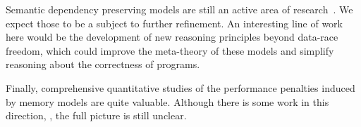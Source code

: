 
Semantic dependency preserving models are still an active 
area of research~\cite{Kang-al:POPL17, Lee-al:PLDI20, Cho-al:PLDI21,
Chakraborty-Vafeiadis:POPL19, Paviotti-al:ESOP20, 
Jagadeesan-al:OOPSLA2020}. 
We expect those to be a subject to 
further refinement. 
An interesting line of work here would be 
the development of new reasoning principles
beyond data-race freedom, which could 
improve the meta-theory of these models and 
simplify reasoning about the correctness of programs.   

Finally, comprehensive quantitative studies 
of the performance penalties induced by memory models are quite valuable.
Although there is some work in this direction,%
\cite{Singh-al:ISCA12, Liu-al:OOPSLA17, Liu-al:PLDI19, 
Vollmer-al:PPoPP17, Dolan-al:PLDI18, Ou-Demsky:OOPSLA18}, 
the full picture is still unclear.
